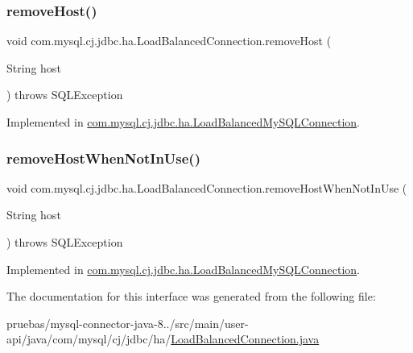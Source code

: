 \subsubsection{\texorpdfstring{remove\+Host()}{removeHost()}}
{\footnotesize\ttfamily void com.\+mysql.\+cj.\+jdbc.\+ha.\+Load\+Balanced\+Connection.\+remove\+Host (\begin{DoxyParamCaption}\item[{String}]{host }\end{DoxyParamCaption}) throws S\+Q\+L\+Exception}



Implemented in \mbox{\hyperlink{classcom_1_1mysql_1_1cj_1_1jdbc_1_1ha_1_1_load_balanced_my_s_q_l_connection_aa6bab7fffe3955a425bbcf99174154c3}{com.\+mysql.\+cj.\+jdbc.\+ha.\+Load\+Balanced\+My\+S\+Q\+L\+Connection}}.

\mbox{\label{interfacecom_1_1mysql_1_1cj_1_1jdbc_1_1ha_1_1_load_balanced_connection_a752d8892b856e9acc215aeaa9fe293ef}} 
\subsubsection{\texorpdfstring{remove\+Host\+When\+Not\+In\+Use()}{removeHostWhenNotInUse()}}
{\footnotesize\ttfamily void com.\+mysql.\+cj.\+jdbc.\+ha.\+Load\+Balanced\+Connection.\+remove\+Host\+When\+Not\+In\+Use (\begin{DoxyParamCaption}\item[{String}]{host }\end{DoxyParamCaption}) throws S\+Q\+L\+Exception}



Implemented in \mbox{\hyperlink{classcom_1_1mysql_1_1cj_1_1jdbc_1_1ha_1_1_load_balanced_my_s_q_l_connection_ad127c1ba70ff4bdba22ad3c70cd1ecff}{com.\+mysql.\+cj.\+jdbc.\+ha.\+Load\+Balanced\+My\+S\+Q\+L\+Connection}}.



The documentation for this interface was generated from the following file\+:\begin{DoxyCompactItemize}
\item 
pruebas/mysql-\/connector-\/java-\/8../src/main/user-\/api/java/com/mysql/cj/jdbc/ha/\mbox{\hyperlink{_load_balanced_connection_8java}{Load\+Balanced\+Connection.\+java}}\end{DoxyCompactItemize}
